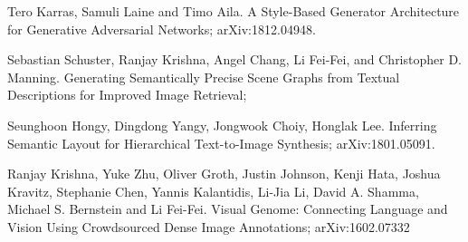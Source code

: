 \documentclass{article}
\begin{document}
\begin{thebibliography}{1}
Tero Karras, Samuli Laine and Timo Aila.
\newblock A Style-Based Generator Architecture for Generative Adversarial Networks;
\newblock arXiv:1812.04948.

Sebastian Schuster, Ranjay Krishna, Angel Chang,
Li Fei-Fei, and Christopher D. Manning.
\newblock Generating Semantically Precise Scene Graphs from Textual Descriptions for Improved Image Retrieval;

Seunghoon Hongy, Dingdong Yangy, Jongwook Choiy, Honglak Lee.
\newblock Inferring Semantic Layout for Hierarchical Text-to-Image Synthesis;
\newblock arXiv:1801.05091.

Ranjay Krishna, Yuke Zhu, Oliver Groth, Justin Johnson, Kenji Hata, Joshua Kravitz, Stephanie Chen, Yannis Kalantidis, Li-Jia Li, David A. Shamma, Michael S. Bernstein and Li Fei-Fei.
\newblock Visual Genome: Connecting Language and Vision Using Crowdsourced Dense Image Annotations;
\newblock arXiv:1602.07332
\end{thebibliography}

% 
\end{document}
